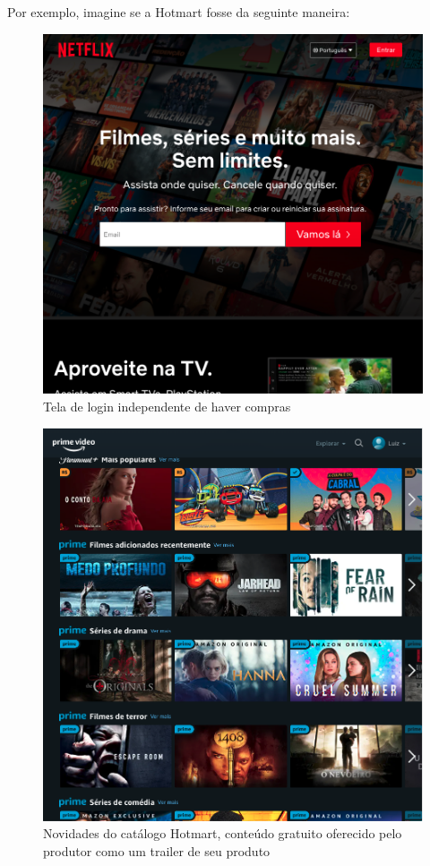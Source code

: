 \documentclass[a4paper,twoside]{article}
\begin{document}
Por exemplo, imagine se a Hotmart fosse da seguinte maneira:
\begin{figure}[H]
    \centering
    \includegraphics[scale=0.37,keepaspectratio=true]{images/04.png}
    \caption{Tela de login independente de haver compras}
\end{figure}

\begin{figure}[H]
    \centering
    \includegraphics[scale=0.30,keepaspectratio=true]{images/05.png}
    \caption{Novidades do catálogo Hotmart, conteúdo gratuito oferecido pelo produtor como um trailer de seu produto}
\end{figure}
\end{document}
